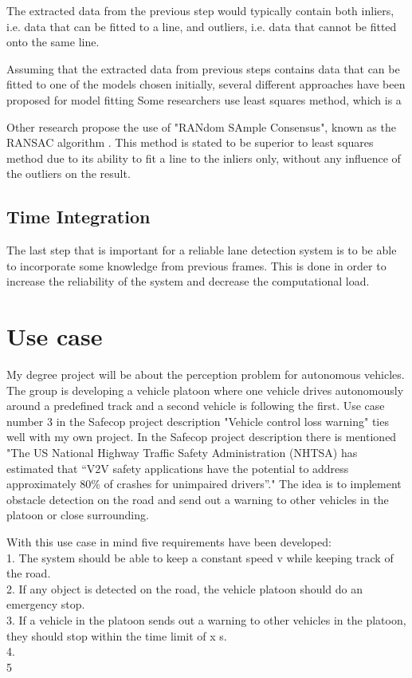 The extracted data from the previous step would typically contain both inliers, i.e. data that can be fitted to a line, and outliers, i.e. data that cannot be fitted onto the same line. \cite{raguram2008comparative}

Assuming that the extracted data from previous steps contains data that can be fitted to one of the models chosen initially, several different approaches have been proposed for model fitting \cite{BarHillel2014} 
Some researchers use least squares method, which is a 

Other research propose the use of "RANdom SAmple Consensus", known as the RANSAC algorithm \cite{huang2009finding}\cite{aly2008real} \cite{li2013lane}. This method is stated to be superior to least squares method due to its ability to fit a line to the inliers only, without any influence of the outliers on the result.  


\subsection{Time Integration}
The last step that is important for a reliable lane detection system is to be able to incorporate some knowledge from previous frames. This is done in order to increase the reliability of the system and decrease the computational load.


\section{Use case}
My degree project will be about the perception problem for autonomous vehicles. The group is developing a vehicle platoon where one vehicle drives autonomously around a predefined track and a second vehicle is following the first. Use case number 3 in the Safecop project description "Vehicle control loss warning" ties well with my own project. In the Safecop project description there is mentioned "The US National Highway Traffic Safety Administration (NHTSA) has estimated that “V2V safety
applications have the potential to address approximately 80\% of crashes for unimpaired drivers”." The idea is to implement obstacle detection on the road and send out a warning to other vehicles in the platoon or close surrounding.

With this use case in mind five requirements have been developed:\\

1. The system should be able to keep a constant speed v while keeping track of the road.\\
2. If any object is detected on the road, the vehicle platoon should do an emergency stop.\\
3. If a vehicle in the platoon sends out a warning to other vehicles in the platoon, they should stop within the time limit of x s. \\
4. \\
5\\

